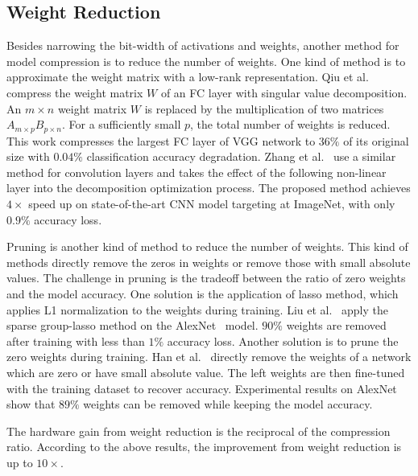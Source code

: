 

\subsection{Weight Reduction}\label{sec:software:wr}
Besides narrowing the bit-width of activations and weights, another method for model compression is to reduce the number of weights. One kind of method is to approximate the weight matrix with a low-rank representation. Qiu et al.~\cite{qiu2016going} compress the weight matrix $W$ of an FC layer with singular value decomposition. An $m\times n$ weight matrix $W$ is replaced by the multiplication of two matrices $A_{m\times p}B_{p\times n}$. For a sufficiently small $p$, the total number of weights is reduced. This work compresses the largest FC layer of VGG network to $36\%$ of its original size with $0.04\%$ classification accuracy degradation. Zhang et al.~\cite{zhang2015efficient} use a similar method for convolution layers and takes the effect of the following non-linear layer into the decomposition optimization process. The proposed method achieves $4\times$ speed up on state-of-the-art CNN model targeting at ImageNet, with only $0.9\%$ accuracy loss.

Pruning is another kind of method to reduce the number of weights. This kind of methods directly remove the zeros in weights or remove those with small absolute values. The challenge in pruning is the tradeoff between the ratio of zero weights and the model accuracy. One solution is the application of lasso method, which applies L1 normalization to the weights during training. Liu et al.~\cite{liu2015sparse} apply the sparse group-lasso method on the AlexNet~\cite{krizhevsky2012imagenet} model. $90\%$ weights are removed after training with less than $1\%$ accuracy loss. Another solution is to prune the zero weights during training. Han et al.~\cite{han2015deep} directly remove the weights of a network which are zero or have small absolute value. The left weights are then fine-tuned with the training dataset to recover accuracy. Experimental results on AlexNet show that $89\%$ weights can be removed while keeping the model accuracy.

The hardware gain from weight reduction is the reciprocal of the compression ratio. According to the above results, the improvement from weight reduction is up to $10\times$.
